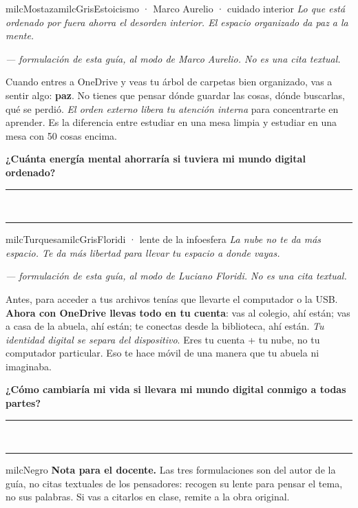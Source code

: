 \documentclass[11pt,letterpaper]{article}
\newcommand{\linead}[1]{\noindent\color{milcLinea}\rule{#1}{0.5pt}\color{milcNegro}}
\begin{document}
\begin{softbox}{milcMostaza}{milcGris}{Estoicismo · Marco Aurelio · cuidado interior}
\textit{Lo que está ordenado por fuera ahorra el desorden interior. El espacio organizado da paz a la mente.}

{\footnotesize\itshape\color{milcNegro!70}--- formulación de esta guía, al modo de Marco Aurelio. No es una cita textual.}

Cuando entres a OneDrive y veas tu árbol de carpetas bien organizado, vas a sentir algo: \textbf{paz}. No tienes que pensar dónde guardar las cosas, dónde buscarlas, qué se perdió. \emph{El orden externo libera tu atención interna} para concentrarte en aprender. Es la diferencia entre estudiar en una mesa limpia y estudiar en una mesa con 50 cosas encima.

\textbf{¿Cuánta energía mental ahorraría si tuviera mi mundo digital ordenado?}
\end{softbox}
\linead{\linewidth}\\[1mm]
\linead{\linewidth}

\begin{softbox}{milcTurquesa}{milcGris}{Floridi · lente de la infoesfera}
\textit{La nube no te da más espacio. Te da más libertad para llevar tu espacio a donde vayas.}

{\footnotesize\itshape\color{milcNegro!70}--- formulación de esta guía, al modo de Luciano Floridi. No es una cita textual.}

Antes, para acceder a tus archivos tenías que llevarte el computador o la USB. \textbf{Ahora con OneDrive llevas todo en tu cuenta}: vas al colegio, ahí están; vas a casa de la abuela, ahí están; te conectas desde la biblioteca, ahí están. \emph{Tu identidad digital se separa del dispositivo}. Eres tu cuenta + tu nube, no tu computador particular. Eso te hace móvil de una manera que tu abuela ni imaginaba.

\textbf{¿Cómo cambiaría mi vida si llevara mi mundo digital conmigo a todas partes?}
\end{softbox}
\linead{\linewidth}\\[1mm]
\linead{\linewidth}

\begin{infoband}{milcNegro}
\textbf{Nota para el docente.} Las tres formulaciones son del autor de la guía, no citas textuales de los pensadores: recogen su lente para pensar el tema, no sus palabras. Si vas a citarlos en clase, remite a la obra original.
\end{infoband}
\end{document}
